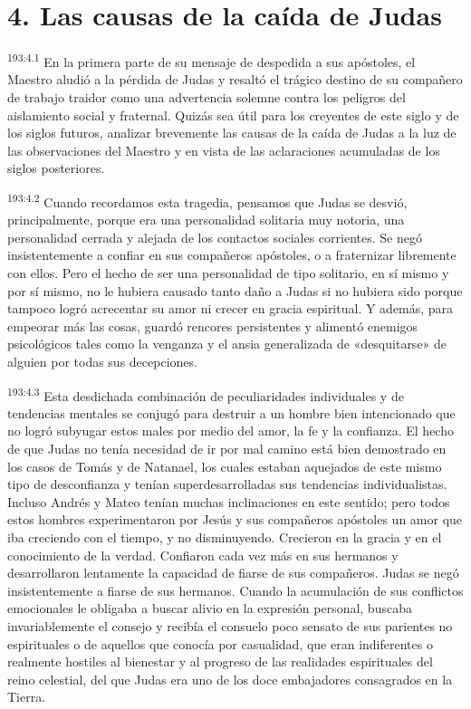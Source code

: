 \section*{4. Las causas de la caída de Judas}
\par 
\textsuperscript{193:4.1} En la primera parte de su mensaje de despedida a sus apóstoles, el Maestro aludió a la pérdida de Judas y resaltó el trágico destino de su compañero de trabajo traidor como una advertencia solemne contra los peligros del aislamiento social y fraternal. Quizás sea útil para los creyentes de este siglo y de los siglos futuros, analizar brevemente las causas de la caída de Judas a la luz de las observaciones del Maestro y en vista de las aclaraciones acumuladas de los siglos posteriores.

\par 
\textsuperscript{193:4.2} Cuando recordamos esta tragedia, pensamos que Judas se desvió, principalmente, porque era una personalidad solitaria muy notoria, una personalidad cerrada y alejada de los contactos sociales corrientes. Se negó insistentemente a confiar en sus compañeros apóstoles, o a fraternizar libremente con ellos. Pero el hecho de ser una personalidad de tipo solitario, en sí mismo y por sí mismo, no le hubiera causado tanto daño a Judas si no hubiera sido porque tampoco logró acrecentar su amor ni crecer en gracia espiritual. Y además, para empeorar más las cosas, guardó rencores persistentes y alimentó enemigos psicológicos tales como la venganza y el ansia generalizada de «desquitarse» de alguien por todas sus decepciones.

\par 
\textsuperscript{193:4.3} Esta desdichada combinación de peculiaridades individuales y de tendencias mentales se conjugó para destruir a un hombre bien intencionado que no logró subyugar estos males por medio del amor, la fe y la confianza. El hecho de que Judas no tenía necesidad de ir por mal camino está bien demostrado en los casos de Tomás y de Natanael, los cuales estaban aquejados de este mismo tipo de desconfianza y tenían superdesarrolladas sus tendencias individualistas. Incluso Andrés y Mateo tenían muchas inclinaciones en este sentido; pero todos estos hombres experimentaron por Jesús y sus compañeros apóstoles un amor que iba creciendo con el tiempo, y no disminuyendo. Crecieron en la gracia y en el conocimiento de la verdad. Confiaron cada vez más en sus hermanos y desarrollaron lentamente la capacidad de fiarse de sus compañeros. Judas se negó insistentemente a fiarse de sus hermanos. Cuando la acumulación de sus conflictos emocionales le obligaba a buscar alivio en la expresión personal, buscaba invariablemente el consejo y recibía el consuelo poco sensato de sus parientes no espirituales o de aquellos que conocía por casualidad, que eran indiferentes o realmente hostiles al bienestar y al progreso de las realidades espirituales del reino celestial, del que Judas era uno de los doce embajadores consagrados en la Tierra.

